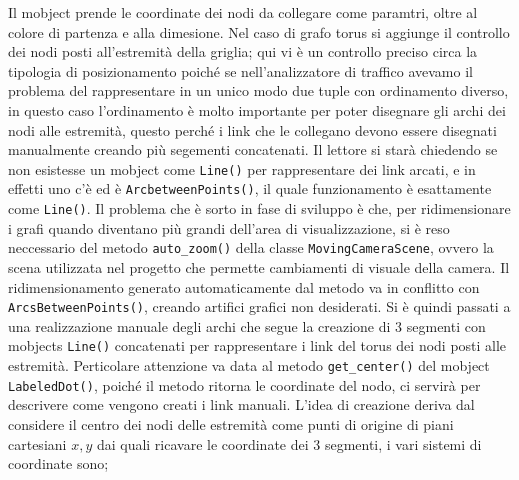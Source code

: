 \documentclass[binding=0.6cm]{sapthesis}
\begin{document}
Il mobject prende le coordinate dei nodi da collegare come paramtri, oltre al colore di partenza e alla dimesione.
Nel caso di grafo torus si aggiunge il controllo dei nodi posti all'estremità della griglia; qui vi è un controllo preciso circa la tipologia di posizionamento poiché se nell'analizzatore di traffico
avevamo il problema del rappresentare in un unico modo due tuple con ordinamento diverso, 
in questo caso l'ordinamento è molto importante per poter disegnare gli archi dei nodi alle estremità, questo perché i link che le collegano devono essere disegnati manualmente creando più segementi concatenati.
Il lettore si starà chiedendo se non esistesse un mobject come \lstinline|Line()| per rappresentare dei link arcati, e in effetti uno c'è ed è \lstinline|ArcbetweenPoints()|, il quale funzionamento è esattamente come \lstinline|Line()|.
Il problema che è sorto in fase di sviluppo è che, per ridimensionare i grafi quando diventano più grandi dell'area di visualizzazione, si è reso neccessario del metodo
 \lstinline|auto_zoom()| della classe \lstinline|MovingCameraScene|, ovvero la scena utilizzata nel progetto che permette cambiamenti di visuale della camera.
Il ridimensionamento generato automaticamente dal metodo va in conflitto con \lstinline|ArcsBetweenPoints()|, creando artifici grafici non desiderati.
Si è quindi passati a una realizzazione manuale degli archi che segue la creazione di 3 segmenti con mobjects \lstinline|Line()| concatenati per rappresentare i link del torus dei nodi posti alle estremità.
Perticolare attenzione va data al metodo \lstinline|get_center()| del mobject \lstinline|LabeledDot()|, poiché il metodo ritorna le coordinate del nodo, ci servirà per descrivere come vengono creati i link manuali.
L'idea di creazione deriva dal considere il centro dei nodi delle estremità come punti di origine di piani cartesiani \(x, y\) dai quali ricavare le coordinate dei 3 segmenti, i vari sistemi di coordinate sono;
\end{document}
